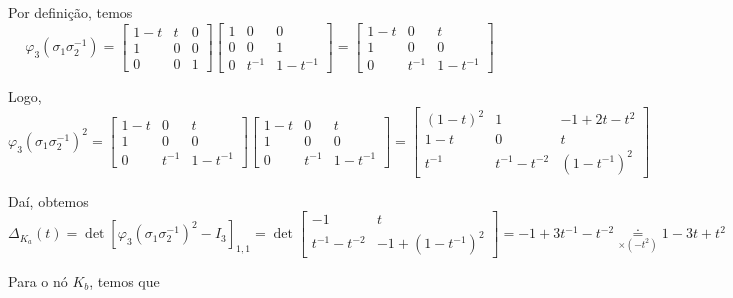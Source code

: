 \documentclass[a4paper,portuguese,11pt,twoside, leqno]{book}
\theoremstyle{definition}
\begin{document}
	\par\vspace{0.3cm} Por definição, temos
	\begin{equation*}
	\varphi_3(\sigma_1\sigma_2^{-1}) = \begin{bmatrix}
	1-t & t & 0 \\
	1 & 0 & 0 \\
	0 & 0 & 1
	\end{bmatrix}\begin{bmatrix}
	1 & 0 & 0 \\
	0 & 0 & 1 \\
	0 & t^{-1} & 1-t^{-1}
	\end{bmatrix} = \begin{bmatrix}
	1-t & 0 & t \\
	1 & 0 & 0 \\
	0 & t^{-1} & 1-t^{-1}
	\end{bmatrix}
	\end{equation*}
	\par\vspace{0.3cm} Logo,
	\begin{equation*}
	\varphi_3(\sigma_1\sigma_2^{-1})^2 = \begin{bmatrix}
	1-t & 0 & t \\
	1 & 0 & 0 \\
	0 & t^{-1} & 1-t^{-1}
	\end{bmatrix}\begin{bmatrix}
	1-t & 0 & t \\
	1 & 0 & 0 \\
	0 & t^{-1} & 1-t^{-1}
	\end{bmatrix} = \begin{bmatrix}
	(1-t)^2 & 1 & -1 +2t-t^2 \\
	1-t & 0 & t \\
	t^{-1} & t^{-1}-t^{-2} & (1-t^{-1})^2
	\end{bmatrix}
	\end{equation*}
	\par\vspace{0.3cm} Daí, obtemos
	\begin{equation*}
	\Delta_{K_a}(t) = \det[\varphi_3(\sigma_1\sigma_2^{-1})^2 - I_3]_{1,1} = \det\begin{bmatrix}
	-1 & t \\
	t^{-1} - t^{-2} & -1+(1-t^{-1})^2
	\end{bmatrix} = -1+3t^{-1}-t^{-2} \underset{\times (-t^2)}{\doteq} 1-3t+t^2
	\end{equation*}
	\par\vspace{0.3cm} Para o nó $K_b$, temos que
\end{document}
